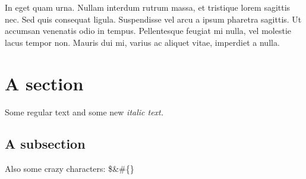\documentclass[12pt,a4paper]{article}%
\begin{document}
\begin{justify}%
In eget quam urna. Nullam interdum rutrum massa, et tristique lorem sagittis nec. Sed quis consequat ligula. Suspendisse vel arcu a ipsum pharetra sagittis. Ut accumsan venenatis odio in tempus. Pellentesque feugiat mi nulla, vel molestie lacus tempor non. Mauris dui mi, varius ac aliquet vitae, imperdiet a nulla.%
\end{justify}%
\section{A section}%
\label{sec:Asection}%
Some regular text and some new %
\textit{italic text. }%
\subsection{A subsection}%
\label{subsec:Asubsection}%
Also some crazy characters: \$\&\#\{\}

%
\end{document}
